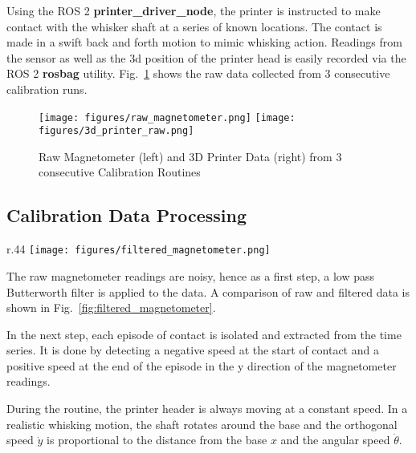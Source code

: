 \documentclass[runningheads]{llncs}
\begin{document}
Using the ROS 2 \textbf{printer\_driver\_node}, the printer is instructed to make contact with the whisker shaft at a series of known locations. The contact is made in a swift back and forth motion to mimic whisking action. Readings from the sensor as well as the 3d position of the printer head is easily recorded via the ROS 2 \textbf{rosbag} utility. Fig.~\ref{fig:calibration_routine} shows the raw data collected from 3 consecutive calibration runs.

\begin{figure}
    \centering
    \texttt{[image: figures/raw\_magnetometer.png]}
    \hspace{10pt}
    \texttt{[image: figures/3d\_printer\_raw.png]}
    \caption{Raw Magnetometer (left) and 3D Printer Data (right) from 3 consecutive Calibration Routines}
    \label{fig:calibration_routine}
\end{figure}

\vspace{-10pt}

\subsection{Calibration Data Processing}\label{sec:calibration_data_analysis}

\begin{wrapfigure}{r}{.44\textwidth}
    \centering
    \texttt{[image: figures/filtered\_magnetometer.png]}
    \caption{Raw and Filtered Magnetometer Reading in the X Axis }
    \label{fig:filtered_magnetometer}
\end{wrapfigure}

The raw magnetometer readings are noisy, hence as a first step, a low pass Butterworth filter is applied to the data. A comparison of raw and filtered data is shown in Fig.~\ref{fig:filtered_magnetometer}.

In the next step, each episode of contact is isolated and extracted from the time series. It is done by detecting a negative speed at the start of contact and a positive speed at the end of the episode in the y direction of the magnetometer readings.

During the routine, the printer header is always moving at a constant speed. In a realistic whisking motion, the shaft rotates around the base and the orthogonal speed \(\dot{y}\) is proportional to the distance from the base \(x\) and the angular speed \(\dot{\theta}\).
\end{document}
